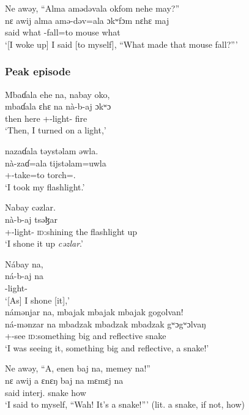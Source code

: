 \ea
 Ne awəy,  “Alma  {amədəvala}  okfom  nehe  may?”\\
\gll nɛ awij    alma   amə-dəv=ala ɔkʷfɔm   nɛhɛ    maj\\
{\oneS} said     what   {\DEP}-fall=to     mouse    {\DEM}  what \\
\glt ‘[I woke up]  I said [to myself], “What made that mouse fall?”’
\z

\subsubsection*{Peak episode}
\ea 
 Mbaɗala  ehe  na, nabay  oko,\\
\gll mbaɗala   ɛhɛ   na nà-b-aj  ɔkʷɔ\\
 then       here   {\PSP}  {\oneS}+{\PFV}-light{}-{\CL}      fire\\
\glt ‘Then, I turned on a light,’
\z

\ea 
 nazaɗala  təystəlam  əwla.\\
\gll nà-zaɗ=ala tijstəlam=uwla\\
{\oneS}+{\PFV}-take=to     torch={\oneS}.{\POSS}\\
\glt ‘I took my flashlight.’
\z 

\ea 
Nabay  cəzlar.\\
\gll nà-b-aj tsəɮar\\
{\oneS}+{\PFV}-light{}-{\CL}       {\textsc{id}:shining the flashlight up}\\
\glt ‘I shone it up \textit{cəzlar}.’
\z

\ea   Nábay  na,\\
\gll ná-b-aj     na\\ 
{\oneS}-light{}-{\CL}  {\PSP}\\
\glt ‘[As] I shone [it],’\\

\medskip
 námənjar  na,  {mbajak  mbajak  mbajak}  gogolvan!\\
\gll ná-mənzar     na     {mbadzak   mbadzak    mbadzak}  gʷɔgʷɔlvaŋ\\
{\oneS}+{\IFV}-see  {\PSP}    {\textsc{id}:something big and reflective}   snake\\
\glt ‘I was seeing it, something big and reflective, a snake!’
\z

\ea  Ne  awəy,    “A,  enen  baj  na,  memey  na!”\\
\gll nɛ awij    a          ɛnɛŋ       baj     na  mɛmɛj   na\\
{\oneS} said    interj.   snake  {\NEG}   {\PSP}  how       {\PSP}\\
\glt ‘I said to myself, “Wah! It’s a snake!”’ (lit. a snake, if not, how)
\z

